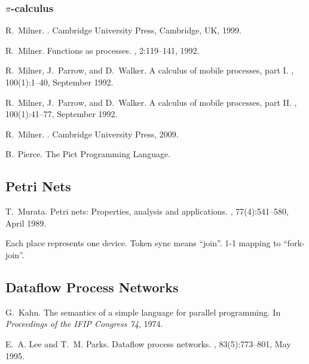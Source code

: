 \documentclass{myproc}
\begin{document}
\eit

\subsubsection{$\pi$-calculus}
\bit
\w R.~Milner.
.
\newblock Cambridge University Press, Cambridge, UK, 1999.

\w R.~Milner.
\newblock Functions as processes.
, 2:119--141, 1992.

\w R.~Milner, J.~Parrow, and D.~Walker.
\newblock A calculus of mobile processes, part {I}.
, 100(1):1--40, September 1992.

\w R.~Milner, J.~Parrow, and D.~Walker.
\newblock A calculus of mobile processes, part {I}{I}.
, 100(1):41--77, September 1992.

\w R.~Milner.
.
\newblock Cambridge University Press, 2009.

\w B.~Pierce. 
\newblock The Pict Programming Language. 
\eit

\subsection{Petri Nets}
\bit
\w T.~Murata.
\newblock Petri nets: Properties, analysis and applications.
, 77(4):541--580, April 1989.
\eit

\bit
\w Each place represents one device. Token sync means ``join''. 1-1 mapping to
``fork-join''.
\eit


\subsection{Dataflow Process Networks}
\bit
\w {}
  \bit
  \eit
\w {}
  \bit
 \eit
\eit
\bit
\w G.~Kahn.
\newblock The semantics of a simple language for parallel programming.
\newblock In {\em Proceedings of the IFIP Congress 74}, 1974.

\w E.~A. Lee and T.~M. Parks.
\newblock Dataflow process networks.
, 83(5):773--801, May 1995.
\eit
\end{document}
